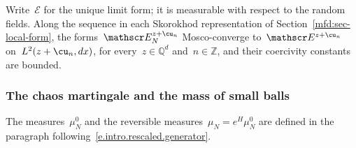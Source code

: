 \documentclass[11pt]{amsart}
\begin{document}
\smallskip

Write~$\mathscr E$ for the unique limit form; it is measurable with respect to the random fields. Along the sequence in each Skorokhod representation of Section~\ref{mfd:sec-local-form}, the forms~$\mathscr E_N^{z+\cu_n}$ Mosco-converge to~$\mathscr E^{z+\cu_n}$ on~$L^2(z+\cu_n,dx)$, for every~$z\in\mathbb Q^d$ and~$n\in\mathbb Z$, and their coercivity constants are bounded.

\subsubsection{The chaos martingale and the mass of small balls}

The measures~$\mu_N^0$ and the reversible measures~$\mu_N=e^H\mu_N^0$ are defined in the paragraph following~\eqref{e.intro.rescaled.generator}.
\end{document}

